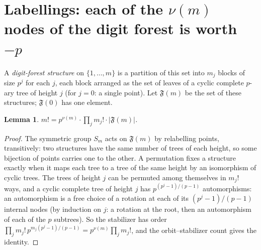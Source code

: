\documentclass[11pt]{article}
\newtheorem{lemma}{Lemma}
\theoremstyle{remark}
\newcommand{\F}{\mathfrak F}
\begin{document}
\section{Labellings: each of the $\nu(m)$ nodes of the digit forest is worth $-p$}

A \emph{digit-forest structure} on $\{1,\dots,m\}$ is a partition of this set into $m_j$
blocks of size $p^j$ for each $j$, each block arranged as the set of leaves of a cyclic
complete $p$-ary tree of height $j$ (for $j=0$: a single point). Let $\F(m)$ be the set of
these structures; $\F(0)$ has one element.

\begin{lemma}\label{L3}
$m!=p^{\nu(m)}\cdot\prod_jm_j!\cdot|\F(m)|$.
\end{lemma}
\begin{proof}
The symmetric group $S_m$ acts on $\F(m)$ by relabelling points, transitively: two structures
have the same number of trees of each height, so some bijection of points carries one to the
other. A permutation fixes a structure exactly when it maps each tree to a tree of the same
height by an isomorphism of cyclic trees. The trees of height $j$ can be permuted among
themselves in $m_j!$ ways, and a cyclic complete tree of height $j$ has
$p^{(p^j-1)/(p-1)}$ automorphisms: an automorphism is a free choice of a rotation at each of
its $(p^j-1)/(p-1)$ internal nodes (by induction on $j$: a rotation at the root, then an
automorphism of each of the $p$ subtrees). So the stabilizer has order
$\prod_j m_j!\,p^{m_j(p^j-1)/(p-1)}=p^{\nu(m)}\prod_jm_j!$, and the orbit--stabilizer count
gives the identity.
\end{proof}
\end{document}
